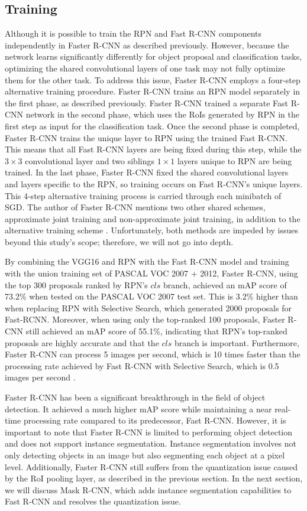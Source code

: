\subsection{Training}  \label{subsec:faster_rcnn_training}
Although it is possible to train the RPN and Fast R-CNN components independently in Faster R-CNN as described previously. However, because the network learns significantly differently for object proposal and classification tasks, optimizing the shared convolutional layers of one task may not fully optimize them for the other task. To address this issue, Faster R-CNN employs a four-step alternative training procedure. Faster R-CNN trains an RPN model separately in the first phase, as described previously. Faster R-CNN trained a separate Fast R-CNN network in the second phase, which uses the RoIs generated by RPN in the first step as input for the classification task. Once the second phase is completed, Faster R-CNN trains the unique layer to RPN using the trained Fast R-CNN. This means that all Fast R-CNN layers are being fixed during this step, while the $3 \times 3$ convolutional layer and two siblings $1 \times 1$ layers unique to RPN are being trained. In the last phase, Faster R-CNN fixed the shared convolutional layers and layers specific to the RPN, so training occurs on Fast R-CNN's unique layers. This 4-step alternative training process is carried through each minibatch of SGD. The author of Faster R-CNN mentions two other shared schemes, approximate joint training and non-approximate joint training, in addition to the alternative training scheme \cite{faster_rcnn_2015}. Unfortunately, both methods are impeded by issues beyond this study's scope; therefore, we will not go into depth.

By combining the VGG16 and RPN with the Fast R-CNN model and training with the union training set of PASCAL VOC 2007 + 2012, Faster R-CNN, using the top 300 proposals ranked by RPN's $cls$ branch, achieved an mAP score of 73.2\% when tested on the PASCAL VOC 2007 test set. This is 3.2\% higher than when replacing RPN with Selective Search, which generated 2000 proposals for Fast-RCNN. Moreover, when using only the top-ranked 100 proposals, Faster R-CNN still achieved an mAP score of 55.1\%, indicating that RPN's top-ranked proposals are highly accurate and that the $cls$ branch is important. Furthermore, Faster R-CNN can process 5 images per second, which is 10 times faster than the processing rate achieved by Fast R-CNN with Selective Search, which is 0.5 images per second \cite{faster_rcnn_2015}. 

Faster R-CNN has been a significant breakthrough in the field of object detection. It achieved a much higher mAP score while maintaining a near real-time processing rate compared to its predecessor, Fast R-CNN. However, it is important to note that Faster R-CNN is limited to performing object detection and does not support instance segmentation. Instance segmentation involves not only detecting objects in an image but also segmenting each object at a pixel level. Additionally, Faster R-CNN still suffers from the quantization issue caused by the RoI pooling layer, as described in the previous section. In the next section, we will discuss Mask R-CNN, which adds instance segmentation capabilities to Fast R-CNN and resolves the quantization issue.